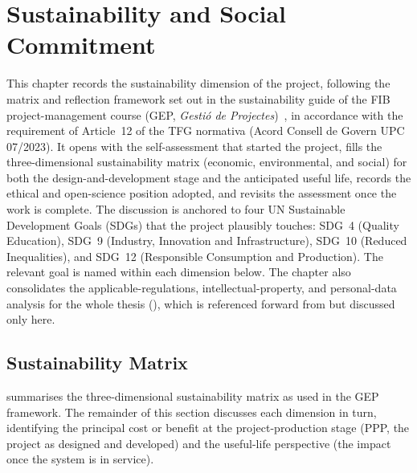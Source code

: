 \chapter{Sustainability and Social Commitment}
\label{ch:sustain}

This chapter records the sustainability dimension of the project,
following the matrix and reflection framework set out in the
sustainability guide of the FIB project-management course (GEP,
\textit{Gesti\'o de Projectes})~\cite{gepSustainabilityReport2018}, in
accordance with the requirement of Article~12 of the TFG normativa
(Acord Consell de Govern UPC 07/2023).
It opens with the self-assessment that started the project, fills the
three-dimensional sustainability matrix (economic, environmental,
and social) for both the design-and-development stage and the
anticipated useful life, records the ethical and open-science
position adopted, and revisits the assessment once the work is
complete.
The discussion is anchored to four UN Sustainable Development Goals
(SDGs) that the project plausibly
touches: SDG~4 (Quality Education), SDG~9 (Industry, Innovation and
Infrastructure), SDG~10 (Reduced Inequalities), and SDG~12
(Responsible Consumption and Production).
The relevant goal is named within each dimension below.
The chapter also consolidates the applicable-regulations,
intellectual-property, and personal-data analysis for the whole
thesis (), which is referenced
forward from  but discussed only here.

\section{Sustainability Matrix}
\label{sec:sust-matrix}

 summarises the
three-dimensional sustainability matrix as used in the GEP
framework.
The remainder of this section discusses each dimension in turn,
identifying the principal cost or benefit at the project-production
stage (PPP, the project as designed and developed) and the
useful-life perspective (the impact once the system is in service).

